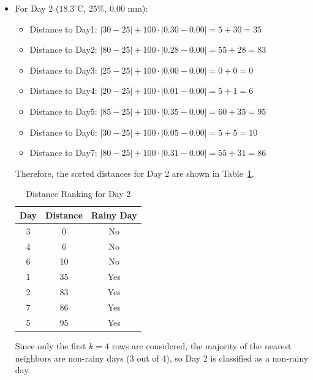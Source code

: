 \documentclass[12pt]{article}
\begin{document}
\begin{ejercicio}
\begin{itemize}
            \item For Day 2 ($18.3^{\circ}\text{C}$, $25\%$, $0.00$ mm):
            \begin{itemize}
                \item Distance to Day1: $|30 - 25| +100\cdot |0.30-0.00|=5+30=35$
                \item Distance to Day2: $|80 - 25| +100\cdot |0.28-0.00|=55+28=83$
                \item Distance to Day3: $|25 - 25| +100\cdot |0.00-0.00|=0+0=0$
                \item Distance to Day4: $|20 - 25| +100\cdot |0.01-0.00|=5+1=6$
                \item Distance to Day5: $|85 - 25| +100\cdot |0.35-0.00|=60+35=95$
                \item Distance to Day6: $|30 - 25| +100\cdot |0.05-0.00|=5+5=10$
                \item Distance to Day7: $|80 - 25| +100\cdot |0.31-0.00|=55+31=86$
            \end{itemize}
            Therefore, the sorted distances for Day 2 are shown in Table~\ref{tab:day2_distances}.
            \begin{table}[h!]
            \centering
            \begin{tabular}{|c|c|c|}
            \hline
            \textbf{Day} & \textbf{Distance} & \textbf{Rainy Day} \\ \hline
            3 & 0 & No \\ 
            4 & 6 & No \\ 
            6 & 10 & No \\ 
            1 & 35 & Yes \\ \hline
            2 & 83 & Yes \\ 
            7 & 86 & Yes \\ 
            5 & 95 & Yes \\ \hline
            \end{tabular}
            \caption{Distance Ranking for Day 2}
            \label{tab:day2_distances}
            \end{table}
            Since only the first $k=4$ rows are considered, the majority of the nearest neighbors are non-rainy days (3 out of 4), so Day 2 is classified as a non-rainy day.
        \end{itemize}
    \end{ejercicio}

    \newpage
\end{document}
